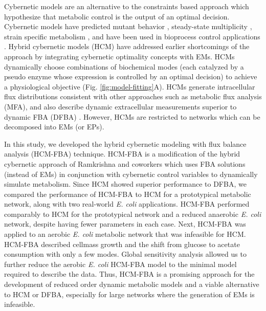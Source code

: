 \documentclass[10pt,twocolumn,twoside,final]{IEEEtran}
\begin{document}
Cybernetic models are an alternative to the constraints based approach which hypothesize that metabolic control is the output of an optimal decision.
Cybernetic models have predicted mutant behavior \cite{1999_varner_ramkrishna_MetaEng,Song:2012aa}, steady-state multiplicity \cite{2012_kim_ramkrishna_BiotechProg}, strain specific metabolism \cite{Song:2011aa}, and have been used in bioprocess control applications \cite{Gadkar:2003aa}.
Hybrid cybernetic models (HCM) have addressed earlier shortcomings of the approach by integrating cybernetic optimality concepts with EMs.
HCMs dynamically choose combinations of biochemical modes (each catalyzed by a pseudo enzyme whose expression is controlled by an optimal decision) to achieve a physiological objective (Fig. \ref{fig:model-fitting}A).
HCMs generate intracellular flux distributions consistent with other approaches such as metabolic flux analysis (MFA), and also describe dynamic extracellular measurements superior to dynamic FBA (DFBA) \cite{2008_kim_varner_ramkrishna_BiotechProg}.
However, HCMs are restricted to networks which can be decomposed into EMs (or EPs).


In this study, we developed the hybrid cybernetic modeling with flux balance analysis (HCM-FBA) technique.
HCM-FBA is a modification of the hybrid cybernetic approach of Ramkrishna and coworkers \cite{2008_kim_varner_ramkrishna_BiotechProg} which uses FBA solutions
(instead of EMs) in conjunction with cybernetic control variables to dynamically simulate metabolism.
Since HCM showed superior performance to DFBA, we compared the performance of HCM-FBA to HCM for a prototypical metabolic network, along with two real-world \emph{E. coli} applications.
HCM-FBA performed comparably to HCM for the prototypical network and a reduced anaerobic \textit{E. coli} network, despite having fewer parameters in each case.
Next, HCM-FBA was applied to an aerobic \textit{E. coli} metabolic network that was infeasible for HCM.
HCM-FBA described cellmass growth and the shift from glucose to acetate consumption with only a few modes.
Global sensitivity analysis allowed us to further reduce the aerobic \textit{E. coli} HCM-FBA model to the minimal model required to describe the data.
Thus, HCM-FBA is a promising approach for the development of reduced order dynamic metabolic models
and a viable alternative to HCM or DFBA, especially for large networks where the generation of EMs is infeasible.
\end{document}
